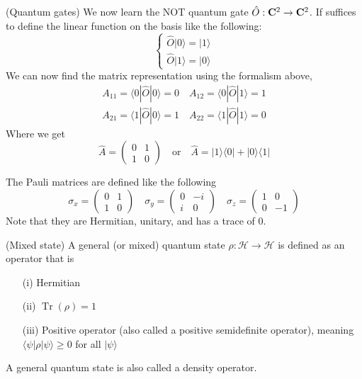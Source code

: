 \begin{ex}
(Quantum gates) We now learn the NOT quantum gate $\hat{O}:{\bf C}^2\rightarrow {\bf C}^2$. If suffices to define the linear function on the basis like the following:
\[\begin{cases}
\hat{O}|0\rangle =|1\rangle \\
\hat{O}|1\rangle =|0\rangle 
\end{cases}\]
We can now find the matrix representation using the formalism above,
\begin{align*}
A_{11}=\langle 0|\hat{O}|0\rangle =0\quad A_{12}=\langle 0|\hat{O}|1\rangle =1\\
A_{21}=\langle 1|\hat{O}|0\rangle =1\quad A_{22}=\langle 1|\hat{O}|1\rangle =0
\end{align*}
Where we get
\[\hat{A}=\begin{pmatrix}
0&1\\1&0
\end{pmatrix}\quad \mathrm{or}\quad \hat{A}=|1\rangle \langle 0|+|0\rangle \langle 1|
\]
\end{ex}
\vspace{2ex}
\begin{defi}
The Pauli matrices are defined like the following
\[\sigma _{x}=\begin{pmatrix}
0&1\\1&0
\end{pmatrix}\quad \sigma _{y}=\begin{pmatrix}
0&-i\\i&0
\end{pmatrix}\quad
\sigma _{z}=\begin{pmatrix}
1&0\\
0&-1
\end{pmatrix}
\]
Note that they are Hermitian, unitary, and has a trace of $0$.
\end{defi}
\vspace{2ex}
\begin{defi}
(Mixed state) A general (or mixed) quantum state $\rho :\mathcal{H}\rightarrow \mathcal{H}$ is defined as an operator that is 
\begin{itemize}
\item[(i)] Hermitian 
\item[(ii)] $\mathop{\mathrm{Tr}}(\rho )=1$
\item[(iii)] Positive operator (also called a positive semidefinite operator), meaning $\langle \psi |\rho |\psi \rangle \geq 0$ for all $|\psi \rangle $
\end{itemize}
A general quantum state is also called a density operator.
\end{defi}
